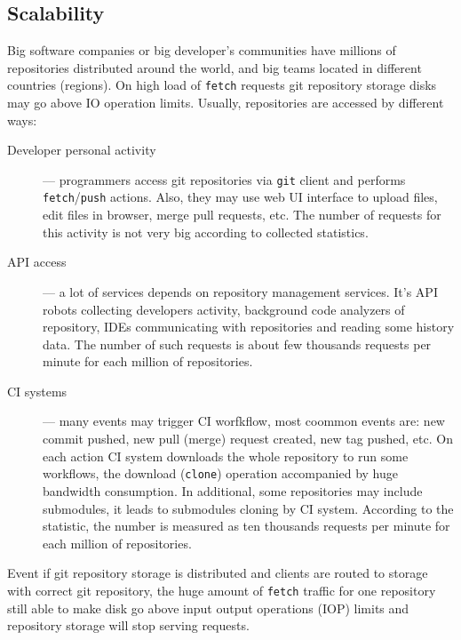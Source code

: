 \documentclass[acmlarge, screen, nonacm]{acmart}
\newcommand{\code}[1]{\texttt{#1}}
\begin{document}
\subsection{Scalability}

Big software companies or big developer's communities have
millions of repositories distributed around the world, and big teams located in different countries
(regions). On high load of \code{fetch} requests git repository storage disks may go above IO operation limits.
Usually, repositories are accessed by different ways:
\begin{description}
  \item[Developer personal activity] --- programmers access git repositories via
    \code{git} client and performs \code{fetch}/\code{push} actions. Also, they
    may use web UI interface to upload files, edit files in browser, merge pull requests, etc.
    The number of requests for this activity is not very big according to collected statistics.
  \item[API access] --- a lot of services depends on repository management services. It's API robots
    collecting developers activity, background code analyzers of repository, IDEs communicating
    with repositories and reading some history data. The number of such requests is about
    few thousands requests per minute for each million of repositories.
  \item[CI systems] --- many events may trigger CI worfkflow, most coommon events are:
    new commit pushed, new pull (merge) request created, new tag pushed, etc.
    On each action CI system downloads the whole repository to run some workflows,
    the download (\code{clone}) operation accompanied by huge bandwidth consumption.
    In additional, some repositories may include submodules, it leads to submodules cloning by CI
    system. According to the statistic, the number is measured as ten thousands requests per minute
    for each million of repositories.
\end{description}

Event if git repository storage is distributed and clients are routed to storage with
correct git repository, the huge amount of \code{fetch} traffic for one repository still able to
make disk go above input output operations (IOP) limits and repository storage will stop
serving requests.
\end{document}
